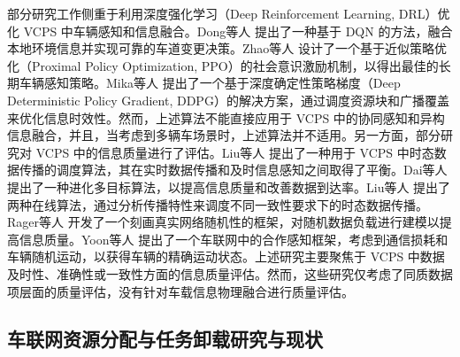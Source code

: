 部分研究工作侧重于利用深度强化学习（Deep Reinforcement Learning, DRL）优化 VCPS 中车辆感知和信息融合。Dong等人 \cite{dong2020spatio} 提出了一种基于 DQN 的方法，融合本地环境信息并实现可靠的车道变更决策。Zhao等人 \cite{zhao2020social} 设计了一个基于近似策略优化（Proximal Policy Optimization, PPO）的社会意识激励机制，以得出最佳的长期车辆感知策略。Mika等人 \cite{mlika2022deep} 提出了一个基于深度确定性策略梯度（Deep Deterministic Policy Gradient, DDPG）的解决方案，通过调度资源块和广播覆盖来优化信息时效性。然而，上述算法不能直接应用于 VCPS 中的协同感知和异构信息融合，并且，当考虑到多辆车场景时，上述算法并不适用。另一方面，部分研究对 VCPS 中的信息质量进行了评估。Liu等人 \cite{liu2014temporal} 提出了一种用于 VCPS 中时态数据传播的调度算法，其在实时数据传播和及时信息感知之间取得了平衡。Dai等人 \cite{dai2019temporal} 提出了一种进化多目标算法，以提高信息质量和改善数据到达率。Liu等人 \cite{liu2014scheduling} 提出了两种在线算法，通过分析传播特性来调度不同一致性要求下的时态数据传播。Rager等人 \cite{rager2017scalability} 开发了一个刻画真实网络随机性的框架，对随机数据负载进行建模以提高信息质量。Yoon等人 \cite{yoon2021performance} 提出了一个车联网中的合作感知框架，考虑到通信损耗和车辆随机运动，以获得车辆的精确运动状态。上述研究主要聚焦于 VCPS 中数据及时性、准确性或一致性方面的信息质量评估。然而，这些研究仅考虑了同质数据项层面的质量评估，没有针对车载信息物理融合进行质量评估。

\subsection{车联网资源分配与任务卸载研究与现状}

